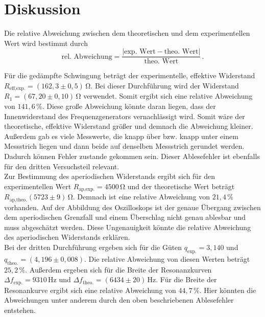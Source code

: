 \section{Diskussion}
\label{sec:Diskussion}
Die relative Abweichung zwischen dem theoretischen und dem experimentellen Wert wird bestimmt durch
$$\text{rel. Abweichung} = \frac{|\text{exp. Wert} - \text{theo. Wert}|}{\text{theo. Wert}}\,.$$

Für die gedämpfte Schwingung beträgt der experimentelle, effektive Widerstand $R_{\text{eff,exp.}} = \left(162,3 \pm 0,5\right)\,\unit{\ohm}$.
Bei dieser Durchführung wird der Widerstand $R_1 = \left(67,20 \pm 0,10\right)\,\unit{\ohm}$ verwendet. Somit ergibt sich eine relative Abweichung 
von $141,6\,\%$. Diese große Abweichung könnte daran liegen, dass der Innenwiderstand des Frequenzgenerators vernachlässigt wird. Somit wäre 
der theoretische, effektive Widerstand größer und demnach die Abweichung kleiner. Außerdem gab es viele Messwerte, die knapp über bzw. knapp unter einem Messstrich
liegen und dann beide auf denselben Messstrich gerundet werden. Dadurch können Fehler zustande gekommen sein. Dieser Ablesefehler ist ebenfalls für den dritten 
Versuchsteil relevant. \\
Zur Bestimmung des aperiodischen Widerstands ergibt sich für den experimentellen Wert $R_{\text{ap,exp.}} = 4500 \,\unit{\ohm}$ und der theoretische
Wert beträgt $R_{\text{ap,theo.}}\left(5723\pm9\right)\,\unit{\ohm}$. Demnach ist eine relative Abweichung von $21,4\,\%$ vorhanden. Auf der Abbildung des Oszilloskops
ist der genaue Übergang zwischen dem aperiodischen Grenzfall und einem Überschlag nicht genau ablesbar und muss abgeschätzt werden. Diese Ungenauigkeit könnte die relative Abweichung 
des aperiodischen Widerstands erklären.\\
Bei der dritten Durchführung ergeben sich für die Güten $q_{\text{exp.}} = 3,140 $ und $q_{\text{theo.}} =\left(4,196\pm0,008\right)$. Die relative Abweichung
von diesen Werten beträgt $25,2\,\%$. Außerdem ergeben sich für die Breite der Resonanzkurven $\Delta f_{\text{exp.}} =9310\,\unit{\hertz}$ und
$\Delta f_{\text{theo.}} =\left(6434\pm20\right)\,\unit{\hertz}$. Für die Breite der Resonankurve ergibt sich eine relative Abweichung von $44,7\,\%$.
Hier könnten die Abweichungen unter anderem durch den oben beschriebenen Ablesefehler entstehen. 
